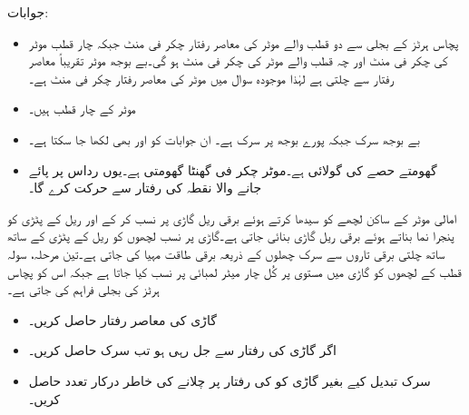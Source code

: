 جوابات:
\begin{itemize}
\item
پچاس ہرٹز کے بجلی سے دو قطب والے موٹر کی معاصر رفتار  چکر فی منٹ جبکہ چار قطب موٹر کی  چکر فی منٹ اور چہ قطب والے موٹر کی  چکر فی منٹ ہو گی۔بے بوجھ موٹر تقریباً معاصر رفتار سے چلتی ہے لہٰذا موجودہ سوال میں موٹر کی معاصر رفتار  چکر فی منٹ ہے۔
\item
موٹر کے چار قطب ہیں۔
\item
بے بوجھ سرک  جبکہ پورے بوجھ پر سرک  ہے۔ ان جوابات کو  اور  بھی لکھا جا سکتا ہے۔
\item
گھومتے حصے کی گولائی  ہے۔موٹر   چکر فی گھنٹا گھومتی ہے۔یوں رداس پر پائے جانے والا نقطہ  کی رفتار سے حرکت کرے گا۔
\end{itemize}
امالی موٹر کے  ساکن لچھے کو سیدھا کرتے ہوئے  برقی ریل گاڑی پر نسب کر کے اور ریل کے پٹڑی کو پنجرا نما بناتے ہوئے برقی ریل گاڑی بنائی جاتی ہے۔گاڑی پر نسب لچھوں کو ریل کے پٹڑی کے ساتھ ساتھ چلتی برقی تاروں سے سرک چھلوں کے ذریعہ برقی طاقت مہیا کی جاتی ہے۔تین مرحلہ، سولہ قطب کے لچھوں کو گاڑی میں مستوی پر کُل چار میٹر لمبائی پر نسب کیا جاتا ہے جبکہ اس کو پچاس ہرٹز کی بجلی فراہم کی جاتی ہے۔
\begin{itemize}
\item
گاڑی کی معاصر رفتار حاصل کریں۔
\item
اگر گاڑی  کی رفتار سے جل رہی ہو تب سرک حاصل کریں۔
\item
سرک تبدیل کیے بغیر گاڑی کو  کی رفتار پر چلانے کی خاطر درکار تعدد حاصل کریں۔ 
\end{itemize}   

